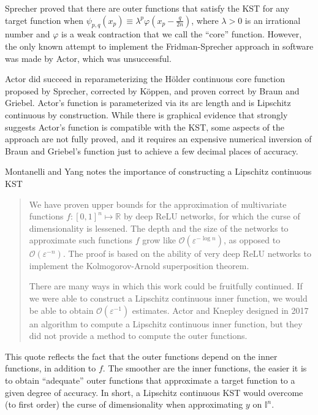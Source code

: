 Sprecher proved that there are outer functions that satisfy the KST for any target function when $\psi_{p,q}\left(x_p\right) \equiv \lambda^p \varphi\left(x_p - \frac{q}{2n}\right)$, where $\lambda > 0$ is an irrational number and $\varphi$ is a weak contraction that we call the ``core'' function. However, the only known attempt to implement the Fridman-Sprecher approach in software was made by Actor, which was unsuccessful.

Actor did succeed in reparameterizing the H\"{o}lder continuous core function proposed by Sprecher, corrected by K\"{o}ppen, and proven correct by Braun and Griebel. Actor's function is parameterized via its arc length and is Lipschitz continuous by construction. While there is graphical evidence that strongly suggests Actor's function is compatible with the KST, some aspects of the approach are not fully proved, and it requires an expensive numerical inversion of Braun and Griebel's function just to achieve a few decimal places of accuracy.

Montanelli and Yang notes the importance of constructing a Lipschitz continuous KST
\begin{quote}
We have proven upper bounds for the approximation of multivariate functions $f : [0, 1]^n \mapsto \mathbb{R}$ by deep ReLU networks, for which the curse of dimensionality is lessened. The depth and the size of the networks to approximate such functions $f$ grow like $\mathcal{O}\left(\varepsilon^{-\log n}\right)$, as opposed to $\mathcal{O}\left(\varepsilon^{-n}\right)$. The proof is based on the ability of very deep ReLU networks to implement the Kolmogorov-Arnold superposition theorem.

There are many ways in which this work could be fruitfully continued. If we were able to construct a Lipschitz continuous inner function, we would be able to
obtain $\mathcal{O}\left(\varepsilon^{-1}\right)$ estimates. Actor and Knepley designed in 2017 an algorithm to compute a Lipschitz continuous inner function, but they did not provide a method to compute the outer functions.
\end{quote}
\noindent This quote reflects the fact that the outer functions depend on the inner functions, in addition to $f$. The smoother are the inner functions, the easier it is to obtain ``adequate'' outer functions that approximate a target function to a given degree of accuracy. In short, a Lipschitz continuous KST would overcome (to first order) the curse of dimensionality when approximating $y$ on $\mathbb{I}^n$. 

